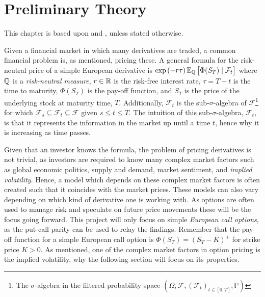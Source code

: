 \chapter{Preliminary Theory}\label{Ch.2}
This chapter is based upon \citep{Hull} and \citep{Cal}, unless stated otherwise.

Given a financial market in which many derivatives are traded, a common financial problem is, as mentioned, pricing these. A general formula for the risk-neutral price of a simple European derivative is $\exp\left(-r\tau\right)\E[\Q]{\Phi(S_T)\mid \mathcal{F}_t}$ where $\mathbb{Q}$ is a \emph{risk-neutral measure}, $r\in\mathbb{R}$ is the risk-free interest rate, $\tau=T-t$ is the time to maturity, $\Phi(S_T)$ is the pay-off function, and $S_T$ is the price of the underlying stock at maturity time, $T$. Additionally, $\mathcal{F}_t$ is the sub-$\sigma$-algebra of $\mathcal{F}$\footnote{The $\sigma$-algebra in the filtered probability space $\left(\Omega,\mathcal{F},\left(\mathcal{F}_t\right)_{t\in[0,T]},\mathbb{P}\right)$} for which $\mathcal{F}_s\subseteq\mathcal{F}_t\subseteq\mathcal{F}$ given $s\leq t\leq T$. The intuition of this sub-$\sigma$-algebra, $\mathcal{F}_t$, is that it represents the information in the market up until a time $t$, hence why it is increasing as time passes.

Given that an investor knows the formula, the problem of pricing derivatives is not trivial, as investors are required to know many complex market factors such as global economic politics, supply and demand, market sentiment, and \emph{implied volatility}. Hence, a model which depends on these complex market factors is often created such that it coincides with the market prices. These models can also vary depending on which kind of derivative one is working with. As options are often used to manage risk and speculate on future price movements these will be the focus going forward. This project will only focus on simple \emph{European call options}, as the put-call parity can be used to relay the findings. Remember that the pay-off function for a simple European call option is $\Phi(S_T) = (S_T - K)^+$ for strike price $K>0$. As mentioned, one of the complex market factors in option pricing is the implied volatility, why the following section will focus on its properties.



